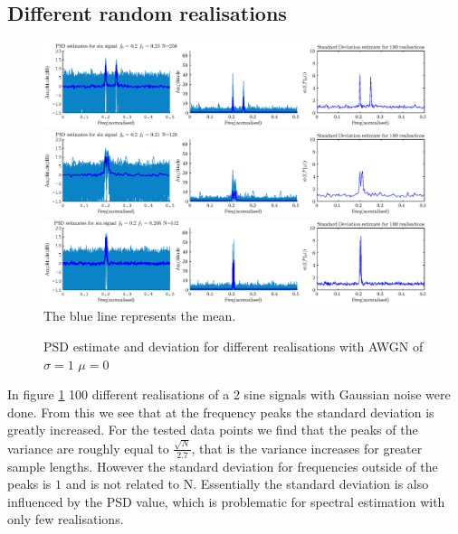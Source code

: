 \documentclass[10pt,twoside,a4paper]{report}
\begin{document}
\subsection{Different random realisations}

\begin{figure}[h!]
\centering
\includegraphics[width=\textwidth]{cw2im/2b.eps}
\includegraphics[width=\textwidth]{cw2im/2b2.eps}
\includegraphics[width=\textwidth]{cw2im/2b3.eps}
The \textcolor{NavyBlue}{blue} line represents the mean.
\caption{PSD estimate and deviation for different realisations with AWGN of $\sigma = 1$ $ \mu = 0$}
\label{fig:2_2b}
\end{figure}


In figure \ref{fig:2_2b} 100 different realisations of a 2 sine signals with Gaussian noise were done. From this we see that at the frequency peaks the standard deviation is greatly increased. For the tested data points we find that the peaks of the variance are roughly equal to $\frac{\sqrt{N}}{2.7}$, that is the variance increases for greater sample lengths. However the standard deviation for frequencies outside of the peaks is $1$ and is not related to N. Essentially the standard deviation is also influenced by the PSD value, which is problematic for spectral estimation with only few realisations.
\end{document}
